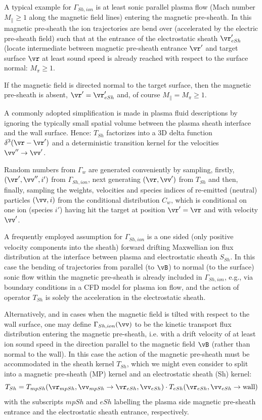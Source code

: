 A typical example for $\Gamma_{Sh,ion}$ is at least sonic parallel plasma flow (Mach number $M_\|\geq 1$ along the
magnetic field lines) entering the magnetic pre-sheath. In this magnetic pre-sheath
the ion trajectories are bend over (accelerated by the electric pre-sheath field) such that at the entrance of the electrostatic sheath $\vr'_{eSh}$
(locate intermediate between magnetic pre-sheath entrance $\vr '$ and target surface $\vr$ at least sound speed is already reached with respect to the surface normal: $M_\pi\geq 1$.

If the magnetic field is directed normal to the target surface, then the magnetic pre-sheath is absent, $\vr' = \vr'_{eSh}$  and, of course
$M_\| = M_\pi \geq 1$.

A commonly adopted simplification is made in plasma fluid descriptions by ignoring the
typically small spatial volume between the plasma sheath interface
and the wall surface. Hence: $T_{Sh}$ factorizes into a 3D delta
function $\delta^3(\vr-\vr')$ and a deterministic transition
kernel for the velocities $\vv'' \rightarrow \vv'$.



Random numbers from $\Gamma_w$ are generated conveniently by
sampling, firstly, $(\vr ' , \vv  '' , i ' ) $
from $\Gamma_{Sh,ion}$, next generating $(\vr ,
\vv ' ) $ from $T_{Sh}$ and then, finally, sampling the weights, velocities and species indices of re-emitted (neutral) particles
$(\vv , i)$ from the conditional distribution $C_w $, which is conditional on one ion (species $i'$) having hit the
target at position $\vr' = \vr$ and with velocity $\vv '$.

A frequently employed assumption for $\Gamma_{Sh,ion}$ is a one sided (only positive velocity components into the sheath)
forward drifting Maxwellian ion flux distribution at the interface between plasma
and electrostatic sheath $S_{Sh}$. In this case the bending of trajectories from parallel (to $\vB$) to
normal (to the surface) sonic flow within the magnetic pre-sheath is already included in $\Gamma_{Sh,ion}$,
e.g., via boundary conditions in a CFD model for plasma ion flow, and the action of
operator $T_{Sh}$ is solely the acceleration in the electrostatic sheath.

Alternatively, and in cases when the magnetic field is tilted with respect to the wall surface,
one may define $\Gamma_{Sh,ion}(\vv)$ to be the kinetic transport flux distribution entering the magnetic pre-sheath,
i.e. with a drift velocity of at least ion sound speed in the direction parallel to the magnetic field $\vB$ (rather than normal to the wall).
In this case the action of the magnetic pre-sheath must be accommodated in the sheath kernel $T_{Sh}$, which we might
even consider to split into a magnetic pre-sheath (MP) kernel and an electrostatic sheath (Sh) kernel:
\begin{equation}
T_{Sh} =  T_{mpSh}(\vr_{mpSh}, \vv_{mpSh} \rightarrow \vr_{eSh}, \vv_{eSh}) \cdot  T_{eSh}(\vr_{eSh},\vv_{eSh} \rightarrow \mbox{wall})
\end{equation}
with the subscripts $mpSh$ and $eSh$ labelling the plasma side magnetic pre-sheath entrance and the electrostatic sheath entrance, respectively.

